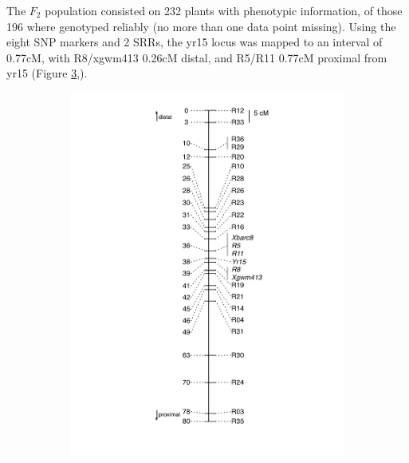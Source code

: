 The $F_{2}$ population consisted on 232 plants with phenotypic information, of those 196 where genotyped reliably (no more than one data point missing). 
Using the eight SNP markers and 2 SRRs, the \acrshort{yr15} locus was mapped to an interval of 0.77cM, with R8/xgwm413 0.26cM distal, and R5/R11 0.77cM proximal from \acrshort{yr15} (Figure \ref{fig:yr15:finalMap},). 


\begin{figure}
	\centering
	\begin{subfigure}{0.45\textwidth}
	\caption{}
	\label{fig:yr15:initialMap}
	\includegraphics[height=0.45\textheight]{Yr15/Figures/selection/initialMap.pdf}
	\end{subfigure}
	~
	\begin{subfigure}{0.45\textwidth}
	\caption{}
	\label{fig:yr15:finalMap}

\end{subfigure}
\end{figure}
